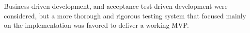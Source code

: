 Business-driven development, and acceptance test-driven development were considered, but a more thorough and rigorous testing system that focused mainly on the implementation was favored to deliver a working MVP.






